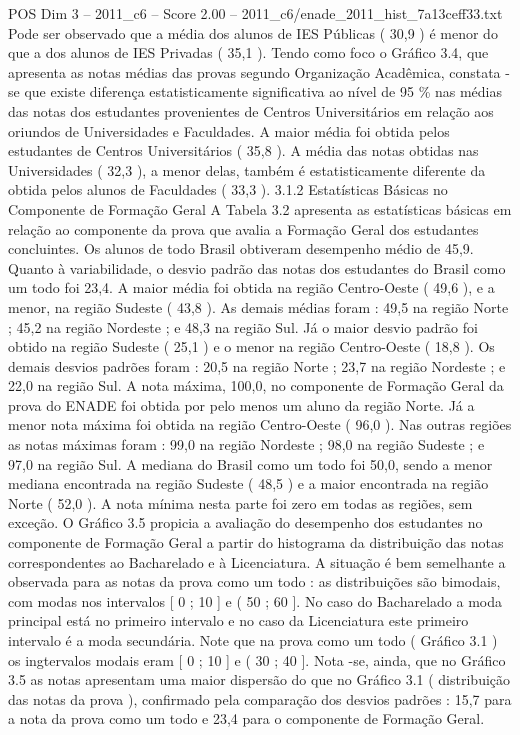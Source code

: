 \begin{textsample}{POS Dim 3 – 2011\_c6 – Score 2.00 – 2011\_c6/enade\_2011\_hist\_7a13ceff33.txt}
Pode ser observado que a média dos alunos de IES Públicas ( 30,9 ) é menor do que a dos alunos de IES Privadas ( 35,1 ).
Tendo como foco o Gráfico 3.4, que apresenta as notas médias das provas segundo Organização Acadêmica, constata -se que existe diferença estatisticamente significativa ao nível de 95 \% nas médias das notas dos estudantes provenientes de Centros Universitários em relação aos oriundos de Universidades e Faculdades.
A maior média foi obtida pelos estudantes de Centros Universitários ( 35,8 ).
A média das notas obtidas nas Universidades ( 32,3 ), a menor delas, também é estatisticamente diferente da obtida pelos alunos de Faculdades ( 33,3 ). 3.1.2 Estatísticas Básicas no Componente de Formação Geral A Tabela 3.2 apresenta as estatísticas básicas em relação ao componente da prova que avalia a Formação Geral dos estudantes concluintes.
Os alunos de todo Brasil obtiveram desempenho médio de 45,9.
Quanto à variabilidade, o desvio padrão das notas dos estudantes do Brasil como um todo foi 23,4.
A maior média foi obtida na região Centro-Oeste ( 49,6 ), e a menor, na região Sudeste ( 43,8 ).
As demais médias foram : 49,5 na região Norte ; 45,2 na região Nordeste ; e 48,3 na região Sul.
Já o maior desvio padrão foi obtido na região Sudeste ( 25,1 ) e o menor na região Centro-Oeste ( 18,8 ).
Os demais desvios padrões foram : 20,5 na região Norte ; 23,7 na região Nordeste ; e 22,0 na região Sul.
A nota máxima, 100,0, no componente de Formação Geral da prova do ENADE foi obtida por pelo menos um aluno da região Norte.
Já a menor nota máxima foi obtida na região Centro-Oeste ( 96,0 ).
Nas outras regiões as notas máximas foram : 99,0 na região Nordeste ; 98,0 na região Sudeste ; e 97,0 na região Sul.
A mediana do Brasil como um todo foi 50,0, sendo a menor mediana encontrada na região Sudeste ( 48,5 ) e a maior encontrada na região Norte ( 52,0 ).
A nota mínima nesta parte foi zero em todas as regiões, sem exceção.
O Gráfico 3.5 propicia a avaliação do desempenho dos estudantes no componente de Formação Geral a partir do histograma da distribuição das notas correspondentes ao Bacharelado e à Licenciatura.
A situação é bem semelhante a observada para as notas da prova como um todo : as distribuições são bimodais, com modas nos intervalos [ 0 ; 10 ] e ( 50 ; 60 ].
No caso do Bacharelado a moda principal está no primeiro intervalo e no caso da Licenciatura este primeiro intervalo é a moda secundária.
Note que na prova como um todo ( Gráfico 3.1 ) os ingtervalos modais eram [ 0 ; 10 ] e ( 30 ; 40 ].
Nota -se, ainda, que no Gráfico 3.5 as notas apresentam uma maior dispersão do que no Gráfico 3.1 ( distribuição das notas da prova ), confirmado pela comparação dos desvios padrões : 15,7 para a nota da prova como um todo e 23,4 para o componente de Formação Geral.

\end{textsample}

